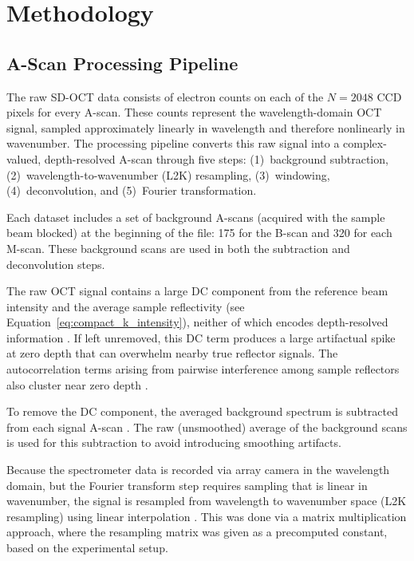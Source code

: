 \documentclass[10pt]{article}
\begin{document}
\section{Methodology}

\subsection{A-Scan Processing Pipeline}
The raw SD-OCT data consists of electron counts on each of the $N = 2048$ CCD pixels for every A-scan. These counts represent the wavelength-domain OCT signal, sampled approximately linearly in wavelength and therefore nonlinearly in wavenumber. The processing pipeline converts this raw signal into a complex-valued, depth-resolved A-scan through five steps: (1)~background subtraction, (2)~wavelength-to-wavenumber (L2K) resampling, (3)~windowing, (4)~deconvolution, and (5)~Fourier transformation.

Each dataset includes a set of background A-scans (acquired with the sample beam blocked) at the beginning of the file: 175 for the B-scan and 320 for each M-scan. These background scans are used in both the subtraction and deconvolution steps.

The raw OCT signal contains a large DC component from the reference beam intensity and the average sample reflectivity (see Equation~\ref{eq:compact_k_intensity}), neither of which encodes depth-resolved information \cite{izattTheoryOpticalCoherence2015,brianlfrostthesis}. If left unremoved, this DC term produces a large artifactual spike at zero depth that can overwhelm nearby true reflector signals. The autocorrelation terms arising from pairwise interference among sample reflectors also cluster near zero depth \cite{izattTheoryOpticalCoherence2015}.

To remove the DC component, the averaged background spectrum is subtracted from each signal A-scan \cite{brianlfrostthesis}. The raw (unsmoothed) average of the background scans is used for this subtraction to avoid introducing smoothing artifacts.

Because the spectrometer data is recorded via array camera in the wavelength domain, but the Fourier transform step requires sampling that is linear in wavenumber, the signal is resampled from wavelength to wavenumber space (L2K resampling) using linear interpolation \cite{brianlfrostthesis}. This was done via a matrix multiplication approach, where the resampling matrix was given as a precomputed constant, based on the experimental setup.
\end{document}
